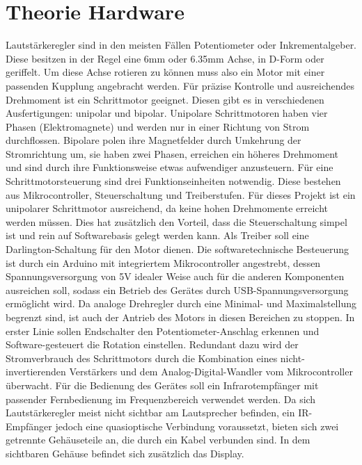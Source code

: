 \documentclass[11pt, titlepage]{report}
\begin{document}
		\section{Theorie Hardware}
		\label{sec:Theorie Hardware}
			Lautstärkeregler sind in den meisten Fällen Potentiometer oder Inkrementalgeber. %
			Diese besitzen in der Regel eine 6mm oder 6.35mm Achse, in D-Form oder geriffelt. Um diese Achse rotieren zu können muss also ein Motor mit einer passenden Kupplung angebracht werden. Für präzise Kontrolle und ausreichendes Drehmoment ist ein Schrittmotor geeignet. Diesen gibt es in verschiedenen Ausfertigungen: unipolar und bipolar. Unipolare Schrittmotoren haben vier Phasen (Elektromagnete) und werden nur in einer Richtung von Strom durchflossen. Bipolare polen ihre Magnetfelder durch Umkehrung der Stromrichtung um, sie haben zwei Phasen, erreichen ein höheres Drehmoment und sind durch ihre Funktionsweise etwas aufwendiger anzusteuern. 
			\newline Für eine Schrittmotorsteuerung sind drei Funktionseinheiten notwendig. Diese bestehen aus Mikrocontroller, Steuerschaltung und Treiberstufen. Für dieses Projekt ist ein unipolarer Schrittmotor ausreichend, da keine hohen Drehmomente erreicht werden müssen. Dies hat zusätzlich den Vorteil, dass die Steuerschaltung simpel ist und rein auf Softwarebasis gelegt werden kann. Als Treiber soll eine Darlington-Schaltung für den Motor dienen. Die softwaretechnische Besteuerung ist durch ein Arduino mit integriertem Mikrocontroller angestrebt, dessen Spannungsversorgung von 5V idealer Weise auch für die anderen Komponenten ausreichen soll, sodass ein Betrieb des Gerätes durch USB-Spannungsversorgung ermöglicht wird. 
			\newline Da analoge Drehregler durch eine Minimal- und Maximalstellung begrenzt sind, ist auch der Antrieb des Motors in diesen Bereichen zu stoppen. In erster Linie sollen Endschalter den Potentiometer-Anschlag erkennen und Software-gesteuert die Rotation einstellen. Redundant dazu wird der Stromverbrauch des Schrittmotors durch die Kombination eines nicht-invertierenden Verstärkers und dem Analog-Digital-Wandler vom Mikrocontroller überwacht. 
			\newline Für die Bedienung des Gerätes soll ein Infrarotempfänger mit passender Fernbedienung im Frequenzbereich verwendet werden. Da sich Lautstärkeregler meist nicht sichtbar am Lautsprecher befinden, ein IR-Empfänger jedoch eine quasioptische Verbindung voraussetzt, bieten sich zwei getrennte Gehäuseteile an, die durch ein Kabel verbunden sind. In dem sichtbaren Gehäuse befindet sich zusätzlich das Display.
		\newpage
\end{document}
